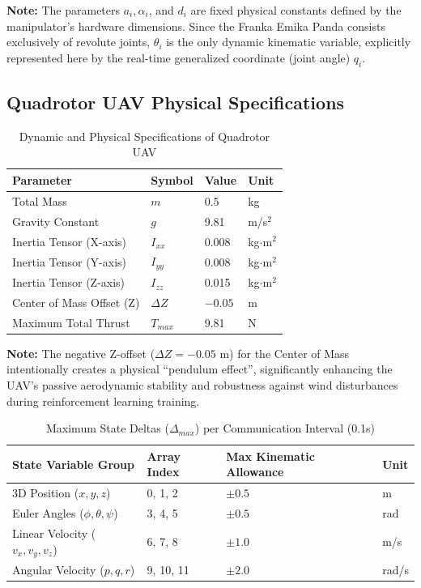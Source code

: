 \textbf{Note:} The parameters $a_i, \alpha_i$, and $d_i$ are fixed physical constants defined by the manipulator's hardware dimensions. 
Since the Franka Emika Panda consists exclusively of revolute joints, $\theta_i$ is the only dynamic kinematic variable, explicitly represented here by the real-time generalized coordinate (joint angle) $q_i$.
\subsection{Quadrotor UAV Physical Specifications}
\begin{table}[H]
  \centering
  \renewcommand{\arraystretch}{1.5} %
  \caption{Dynamic and Physical Specifications of Quadrotor UAV}
  \label{tab:quadrotor_specs}
  \begin{tabular}{llll}
    \toprule
    Parameter & Symbol & Value & Unit \\
    \midrule
    Total Mass & $m$ & 0.5 & kg \\
    Gravity Constant & $g$ & 9.81 & m/s$^2$ \\
    Inertia Tensor (X-axis) & $I_{xx}$ & 0.008 & kg$\cdot$m$^2$ \\
    Inertia Tensor (Y-axis) & $I_{yy}$ & 0.008 & kg$\cdot$m$^2$ \\
    Inertia Tensor (Z-axis) & $I_{zz}$ & 0.015 & kg$\cdot$m$^2$ \\
    Center of Mass Offset (Z) & $\Delta Z$ & $-0.05$ & m \\
    Maximum Total Thrust & $T_{max}$ & 9.81 & N \\
    \bottomrule
  \end{tabular}
\end{table}
\textbf{Note:} The negative Z-offset ($\Delta Z = -0.05$ m) for the Center of Mass intentionally creates a physical ``pendulum effect'', significantly enhancing the UAV's passive aerodynamic stability and robustness against wind disturbances during reinforcement learning training.
\begin{table}[H]
  \centering
  \renewcommand{\arraystretch}{1.5} %
  \caption{Maximum State Deltas ($\Delta_{max}$) per Communication Interval (0.1s)}
  \label{tab:max_state_deltas}
  \begin{tabular}{llll}
    \toprule
    State Variable Group & Array Index & Max Kinematic Allowance & Unit \\
    \midrule
    3D Position ($x, y, z$)             & 0, 1, 2   & $\pm 0.5$ & m \\
    Euler Angles ($\phi, \theta, \psi$) & 3, 4, 5   & $\pm 0.5$ & rad \\
    Linear Velocity ($v_x, v_y, v_z$)   & 6, 7, 8   & $\pm 1.0$ & m/s \\
    Angular Velocity ($p, q, r$)        & 9, 10, 11 & $\pm 2.0$ & rad/s \\
    \bottomrule
  \end{tabular}
\end{table}
